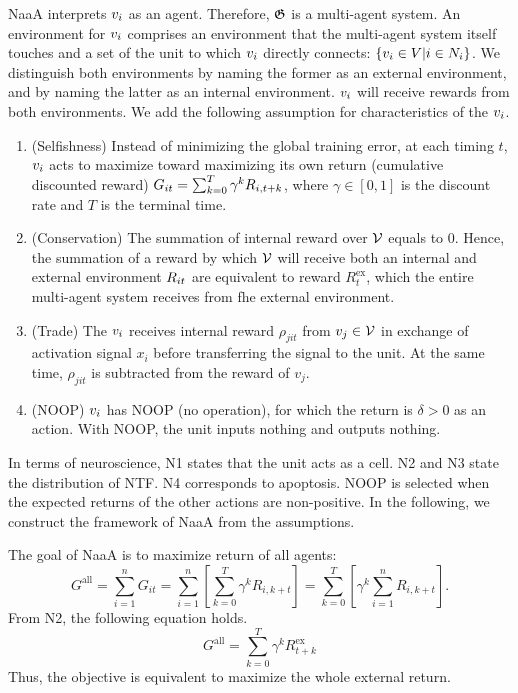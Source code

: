 NaaA interprets $v_{i}$ as an agent.
Therefore, $\mathfrak{G}$ is a multi-agent system.
An environment for $v_{i}$ comprises an environment that the multi-agent system itself touches and a 
set of the unit to which $v_{i}$ directly connects: $\{v_i \in V | i \in N_i\}$.
We distinguish both environments by naming the former as an external environment, and by naming the latter as an internal environment.
$v_{i}$ will receive rewards from both environments.
We add the following assumption for characteristics of the $v_{i}$.
\begin{enumerate}
\renewcommand{\labelenumi}{N\arabic{enumi}:}
\item (Selfishness) 
	Instead of minimizing the global training error,
	at each timing $t$, $v_{i}$ acts to maximize toward maximizing its own return (cumulative discounted reward)
	$G_{it} = \sum_{k=0}^T \gamma^k R_{i,t+k}$, where $\gamma \in [0, 1]$ is the discount rate and $T$ is the terminal time.
\item (Conservation) 
	The summation of internal reward over $\mathcal{V}$ equals to 0.
	Hence, the summation of a reward by which $\mathcal{V}$ will receive both an internal and external environment $R_{it}$ are equivalent to reward $R_t^{\mathrm{ex}}$, which the entire multi-agent system receives from fhe external environment.
\item (Trade) 
	The $v_{i}$ receives internal reward $\rho_{jit}$ from $v_{j} \in \mathcal{V}$ in exchange of activation signal $x_i$
	before transferring the signal to the unit. At the same time, $\rho_{jit}$ is subtracted from the reward of $v_j$.
\item (NOOP) 
	$v_{i}$ has NOOP (no operation), for which the return is $\delta > 0$ as an action.
	With NOOP, the unit inputs nothing and outputs nothing.
\end{enumerate}
In terms of neuroscience,
N1 states that the unit acts as a cell.
N2 and N3 state the distribution of NTF. N4 corresponds to apoptosis.
NOOP is selected when the expected returns of the other actions are non-positive.
In the following, we construct the framework of NaaA from the assumptions.

The goal of NaaA is to maximize return of all agents:
\begin{equation}
	G^\mathrm{all} = \sum_{i=1}^n G_{it} = \sum_{i=1}^n \left[ \sum_{k=0}^T \gamma^k R_{i,k+t} \right] 
		= \sum_{k=0}^T \left[ \gamma^k \sum_{i=1}^n R_{i,k+t} \right].
\end{equation}
From N2, the following equation holds.
\begin{equation}
	G^\mathrm{all} = \sum_{k=0}^T \gamma^k R_{t+k}^{\mathrm{ex}}
\end{equation}
Thus, the objective is equivalent to maximize the whole external return.

